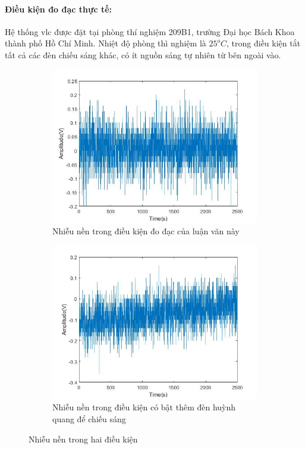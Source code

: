 \paragraph{Điều kiện đo đạc thực tế:}
Hệ thống \ac{vlc} được đặt tại phòng thí nghiệm 209B1, trường Đại học Bách Khoa thành phố Hồ Chí Minh. Nhiệt độ phòng thì nghiệm là $25^o C$, trong điều kiện tắt tất cả các đèn chiếu sáng khác, có ít nguồn sáng tự nhiên từ bên ngoài vào.
\begin{figure}
	\centering
	\begin{subfigure}{.5\textwidth}
		  \centering
		  \includegraphics[width=1\linewidth]{Image/floor_noise}
		  \caption{Nhiễu nền trong điều kiện đo đạc của luận văn này}
		  \label{fig: floor_noise}
	\end{subfigure}%
	\begin{subfigure}{.5\textwidth}
		  \centering
		  \includegraphics[width=1\linewidth]{Image/fluorescence_noise}
		  \caption{Nhiễu nền trong điều kiện có bật thêm đèn huỳnh quang để chiếu sáng}
		  \label{fig: fluo_noise}
	\end{subfigure}
	\caption{Nhiễu nền trong hai điều kiện}
	\label{fig:noise}
\end{figure}

